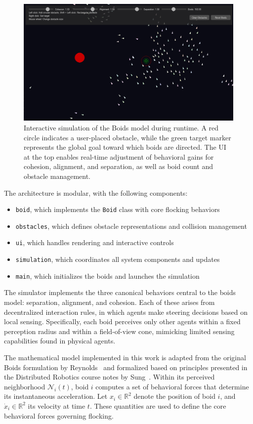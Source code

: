 \documentclass[12pt]{article}
\begin{document}
\begin{linenumbers}
\begin{figure}[h!]
    \centering
    \includegraphics[width=0.7\linewidth]{boids_sim.png}
    \caption{Interactive simulation of the Boids model during runtime. A red circle indicates a user-placed obstacle, while the green target marker represents the global goal toward which boids are directed. The UI at the top enables real-time adjustment of behavioral gains for cohesion, alignment, and separation, as well as boid count and obstacle management.}
    \label{fig:boids_sim}
  \end{figure}

The architecture is modular, with the following components:
\begin{itemize}[nosep]
    \item \texttt{boid}, which implements the \texttt{Boid} class with core flocking behaviors
    \item \texttt{obstacles}, which defines obstacle representations and collision management
    \item \texttt{ui}, which handles rendering and interactive controls
    \item \texttt{simulation}, which coordinates all system components and updates
    \item \texttt{main}, which initializes the boids and launches the simulation
\end{itemize}

The simulator implements the three canonical behaviors central to the boids model: separation, alignment, and cohesion. Each of these arises from decentralized interaction rules, in which agents make steering decisions based on local sensing. Specifically, each boid perceives only other agents within a fixed perception radius and within a field-of-view cone, mimicking limited sensing capabilities found in physical agents.

The mathematical model implemented in this work is adapted from the original Boids formulation by Reynolds~\cite{reynolds1987flocks} and formalized based on principles presented in the Distributed Robotics course notes by Sung~\cite{sung2025distributed}. Within its perceived neighborhood \(\mathcal{N}_i(t)\), boid \(i\) computes a set of behavioral forces that determine its instantaneous acceleration. Let \(x_i \in \mathbb{R}^2\) denote the position of boid \(i\), and \(\dot{x}_i \in \mathbb{R}^2\) its velocity at time \(t\). These quantities are used to define the core behavioral forces governing flocking.


\end{linenumbers}
\end{document}
